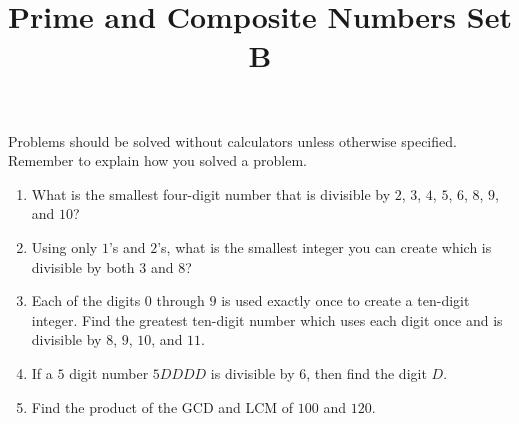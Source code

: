 \documentclass[twocolumn]{article}
\title{Prime and Composite Numbers Set B}
\date{}
\author{}
\begin{document}
\maketitle
\noindent Problems should be solved without calculators unless otherwise specified.
Remember to explain how you solved a problem.
\begin{enumerate}
    \item What is the smallest four-digit number that is divisible by $2$, $3$, $4$, $5$, $6$, $8$, $9$, and $10$?
        \vspace{3cm}
    \item Using only $1$'s and $2$'s, what is the smallest integer you can create which is divisible by both $3$ and $8$?
        \vspace{3cm}
    \item Each of the digits $0$ through $9$ is used exactly once to create a ten-digit integer.
        Find the greatest ten-digit number which uses each digit once and is divisible by $8$, $9$, $10$, and $11$.
        \vspace{3cm}
    \item If a $5$ digit number $5DDDD$ is divisible by $6$, then find the digit $D$.
        \vspace{3cm}
    \item Find the product of the GCD and LCM of $100$ and $120$.
        \vspace{3cm}
\end{enumerate}
\end{document}
